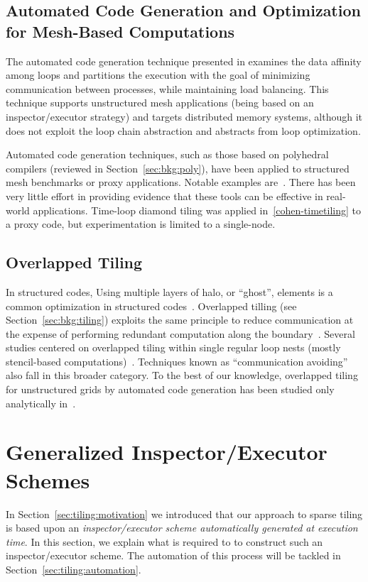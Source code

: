 \subsection*{Automated Code Generation and Optimization for Mesh-Based Computations}
The automated code generation technique presented in \cite{Ravishankar12} examines the data affinity among loops and partitions the execution with the goal of minimizing communication between processes, while maintaining load balancing. This technique supports unstructured mesh applications (being based on an inspector/executor strategy) and targets distributed memory systems, although it does not exploit the loop chain abstraction and abstracts from loop optimization.

Automated code generation techniques, such as those based on polyhedral compilers (reviewed in Section~\ref{sec:bkg:poly}), have been applied to structured mesh benchmarks or proxy applications. Notable examples are~\cite{pluto,polly,loopy}. There has been very little effort in providing evidence that these tools can be effective in real-world applications. Time-loop diamond tiling was applied in~\ref{cohen-timetiling} to a proxy code, but experimentation is limited to a single-node.

\subsection*{Overlapped Tiling}
In structured codes, Using multiple layers of halo, or ``ghost'', elements is a common optimization in structured codes~\cite{Bassetti98}. Overlapped tilling (see Section~\ref{sec:bkg:tiling}) exploits the same principle to reduce communication at the expense of performing redundant computation along the boundary~\cite{Zhou12}. Several studies centered on overlapped tiling within single regular loop nests (mostly stencil-based computations)~\cite{Meng09,Krishnamoorthy07,Chen02}. Techniques known as ``communication avoiding''~\cite{Demmel08,commAvoidingSparse2009} also fall in this broader category. To the best of our knowledge, overlapped tiling for unstructured grids by automated code generation has been studied only analytically in~\cite{gihan-overlapped}.



\section{Generalized Inspector/Executor Schemes}
\label{sec:tiling:lc}
In Section~\ref{sec:tiling:motivation} we introduced that our approach to sparse tiling is based upon an \textit{inspector/executor scheme automatically generated at execution time}. In this section, we explain what is required to to construct such an inspector/executor scheme. The automation of this process will be tackled in Section~\ref{sec:tiling:automation}.


